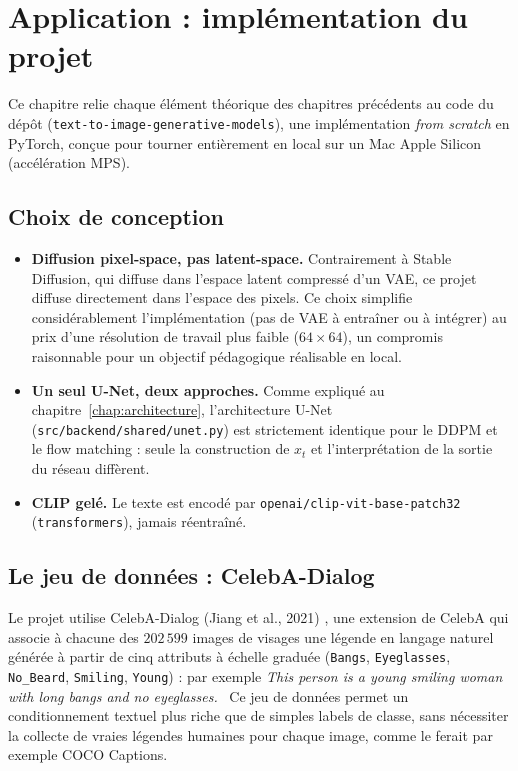 \chapter{Application : implémentation du projet}
\label{chap:project}

Ce chapitre relie chaque élément théorique des chapitres précédents au code du dépôt
(\texttt{text-\linebreak[1]to-\linebreak[1]image-\linebreak[1]generative-\linebreak[1]models}), une
implémentation \emph{from scratch} en PyTorch, conçue pour tourner entièrement en local sur un Mac
Apple Silicon (accélération MPS).

\section{Choix de conception}

\begin{itemize}
    \item \textbf{Diffusion pixel-space, pas latent-space.} Contrairement à Stable Diffusion, qui
    diffuse dans l'espace latent compressé d'un VAE, ce projet diffuse directement dans l'espace des
    pixels. Ce choix simplifie considérablement l'implémentation (pas de VAE à entraîner ou à
    intégrer) au prix d'une résolution de travail plus faible ($64\times64$), un compromis raisonnable
    pour un objectif pédagogique réalisable en local.
    \item \textbf{Un seul U-Net, deux approches.} Comme expliqué au chapitre~\ref{chap:architecture},
    l'architecture U-Net (\texttt{src/backend/shared/unet.py}) est strictement identique pour le DDPM
    et le flow matching : seule la construction de $x_t$ et l'interprétation de la sortie du réseau
    diffèrent.
    \item \textbf{CLIP gelé.} Le texte est encodé par \texttt{openai/clip-vit-base-patch32}
    (\texttt{transformers}), jamais réentraîné.
\end{itemize}

\section{Le jeu de données : CelebA-Dialog}

Le projet utilise CelebA-Dialog (Jiang et al., 2021) \cite{jiang2021celebadialog}, une extension de
CelebA qui associe à chacune des $202\,599$ images de visages une légende en langage naturel générée à
partir de cinq attributs à échelle graduée (\texttt{Bangs}, \texttt{Eyeglasses}, \texttt{No\_Beard},
\texttt{Smiling}, \texttt{Young}) : par exemple \og \emph{This person is a young smiling woman with
long bangs and no eyeglasses.} \fg\ Ce jeu de données permet un conditionnement textuel plus riche que
de simples labels de classe, sans nécessiter la collecte de vraies légendes humaines pour chaque
image, comme le ferait par exemple COCO Captions.

